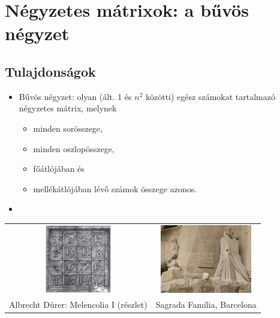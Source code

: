 \documentclass[usenames,dvipsnames,aspectratio=169]{beamer}
\begin{document}
\begin{frame}
  \begin{exampleblock}{}
    
  \end{exampleblock}
\end{frame}

\begin{frame}
  \begin{exampleblock}{}
    
  \end{exampleblock}
\end{frame}

\section{Négyzetes mátrixok: a bűvös négyzet}
\subsection{Tulajdonságok}
\begin{frame}
  \begin{itemize}
    \item Bűvös négyzet: olyan (ált. 1 és $n^2$ közötti) egész számokat tartalmazó négyzetes mátrix, melynek
    \begin{itemize}
      \item minden sorösszege,
      \item minden oszlopösszege,
      \item főátlójában és
      \item mellékátlójában lévő számok összege azonos.
    \end{itemize}
    \item {}
  \end{itemize}
  \begin{center}
    \tiny
    \begin{tabular}{cc}
      \includegraphics[height=3cm]{melancolia.jpg} & \includegraphics[height=3cm]{sagrada.jpg} \\
      Albrecht Dürer: Melencolia I (részlet) & Sagrada Família, Barcelona\\
    \end{tabular}
  \end{center}
\end{frame}
\end{document}
